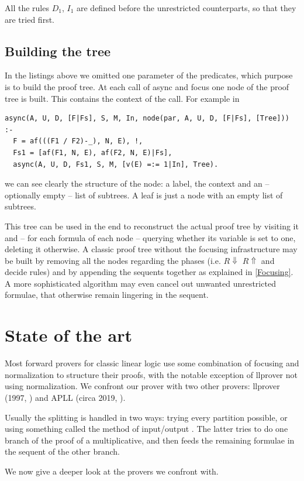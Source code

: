 \documentclass[a4paper, 12pt, english]{report}
\begin{document}
All the rules $D_1$, $I_1$ are defined before the unrestricted counterparts, so that they are tried first.


\section{Building the tree}
In the listings above we omitted one parameter of the predicates, which purpose is to build the proof tree.
At each call of async and focus one node of the proof tree is built.
This contains the context of the call.
For example in
\begin{verbatim}
async(A, U, D, [F|Fs], S, M, In, node(par, A, U, D, [F|Fs], [Tree])) :- 
  F = af(((F1 / F2)-_), N, E), !,
  Fs1 = [af(F1, N, E), af(F2, N, E)|Fs],
  async(A, U, D, Fs1, S, M, [v(E) =:= 1|In], Tree).
\end{verbatim}
we can see clearly the structure of the node: a label, the context and an -- optionally empty -- list of subtrees.
A leaf is just a node with an empty list of subtrees.

This tree can be used in the end to reconstruct the actual proof tree by visiting it and -- for each formula of each node -- querying whether its variable is set to one, deleting it otherwise.
A classic proof tree without the focusing infrastructure may be built by removing all the nodes regarding the phases (i.e. $R\!\Downarrow$ $R\!\Uparrow$ and decide rules) and by appending the sequents together as explained in \ref{Focusing}. 
A more sophisticated algorithm may even cancel out unwanted unrestricted formulae, that otherwise remain lingering in the sequent.

\chapter{State of the art}
Most forward provers for classic linear logic use some combination of focusing and normalization to structure their proofs, with the notable exception of llprover not using normalization.	%
We confront our prover with two other provers: llprover (1997, %
) and APLL (circa 2019, %
).

Usually the splitting is handled in two ways: trying every partition possible, or using something called the method of input/output %
. The latter tries to do one branch of the proof of a multiplicative, and then feeds the remaining formulae in the sequent of the other branch.

We now give a deeper look at the provers we confront with.
\end{document}
